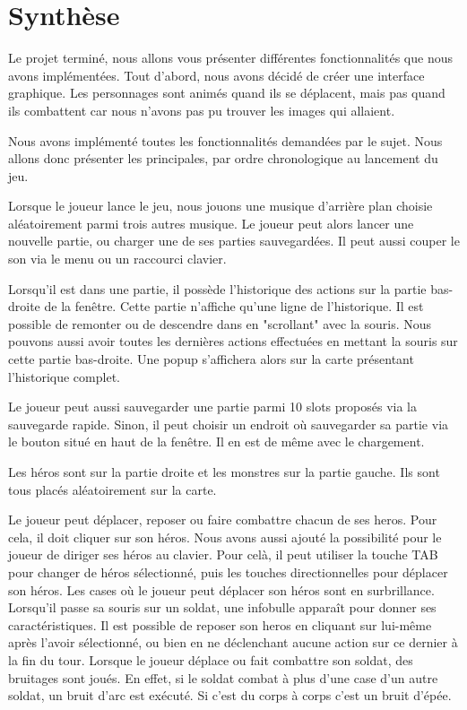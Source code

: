 \documentclass{article}
\begin{document}
\section{Synthèse}
Le projet terminé, nous allons vous présenter différentes fonctionnalités que nous avons implémentées.
Tout d'abord, nous avons décidé de créer une interface graphique.
Les personnages sont animés quand ils se déplacent, mais pas quand ils combattent car nous n'avons pas pu trouver les images qui allaient.

Nous avons implémenté toutes les fonctionnalités demandées par le sujet.
Nous allons donc présenter les principales, par ordre chronologique au lancement du jeu.

Lorsque le joueur lance le jeu, nous jouons une musique d'arrière plan choisie aléatoirement parmi trois autres musique.
Le joueur peut alors lancer une nouvelle partie, ou charger une de ses parties sauvegardées.
Il peut aussi couper le son via le menu ou un raccourci clavier.

Lorsqu'il est dans une partie, il possède l'historique des actions sur la partie bas-droite de la fenêtre. 
Cette partie n'affiche qu'une ligne de l'historique. Il est possible de remonter ou de descendre dans en "scrollant" avec la souris.
Nous pouvons aussi avoir toutes les dernières actions effectuées en mettant la souris sur cette partie bas-droite.
Une popup s'affichera alors sur la carte présentant l'historique complet.

Le joueur peut aussi sauvegarder une partie parmi 10 slots proposés via la sauvegarde rapide.
Sinon, il peut choisir un endroit où sauvegarder sa partie via le bouton situé en haut de la fenêtre.
Il en est de même avec le chargement.

Les héros sont sur la partie droite et les monstres sur la partie gauche. Ils sont tous placés aléatoirement sur la carte.

Le joueur peut déplacer, reposer ou faire combattre chacun de ses heros.
Pour cela, il doit cliquer sur son héros. Nous avons aussi ajouté la possibilité pour le joueur de diriger ses héros au clavier.
Pour celà, il peut utiliser la touche TAB pour changer de héros sélectionné, puis les touches directionnelles pour déplacer son héros.
Les cases où le joueur peut déplacer son héros sont en surbrillance.
Lorsqu'il passe sa souris sur un soldat, une infobulle apparaît pour donner ses caractéristiques.
Il est possible de reposer son heros en cliquant sur lui-même après l'avoir sélectionné, ou bien en ne déclenchant aucune action sur ce dernier à la fin du tour.
Lorsque le joueur déplace ou fait combattre son soldat, des bruitages sont joués.
En effet, si le soldat combat à plus d'une case d'un autre soldat, un bruit d'arc est exécuté.
Si c'est du corps à corps c'est un bruit d'épée.
\end{document}
